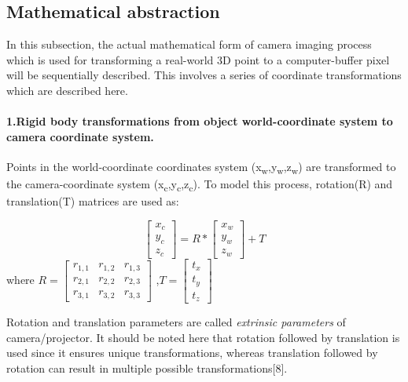 \subsection{Mathematical abstraction}  
In this subsection, the actual mathematical form of camera imaging process which is used for transforming a real-world 3D point to a computer-buffer pixel will be sequentially described. This involves a series of coordinate transformations which are described here.   

\paragraph{1.Rigid body transformations from object world-coordinate system to camera coordinate system.}  
Points in the world-coordinate coordinates system (x\textsubscript{w},y\textsubscript{w},z\textsubscript{w}) are transformed to the camera-coordinate system (x\textsubscript{c},y\textsubscript{c},z\textsubscript{c}). To model this process, rotation(R) and translation(T) matrices are used as:  
  
\begin{equation}  
\begin{bmatrix}  
x_c \\  
y_c \\  
z_c  
\end{bmatrix}  
=  
R*   \begin{bmatrix}  
      x_w \\  
      y_w \\  
      z_w  
      \end{bmatrix}  
+T  
\end{equation}  
where $R=\begin{bmatrix}  
         r_{1,1} & r_{1,2} & r_{1,3} \\  
         r_{2,1} & r_{2,2} & r_{2,3} \\  
         r_{3,1} & r_{3,2} & r_{3,3}   
         \end{bmatrix}$  
,$T=\begin{bmatrix}  
    t_x \\  
    t_y \\  
    t_z  
   \end{bmatrix}$ \newline  
  
  
Rotation and translation parameters are called \textit{extrinsic parameters} of camera/projector. It should be noted here that rotation followed by translation is used since it ensures unique transformations, whereas translation followed by rotation can result in multiple possible transformations[8].  
  
